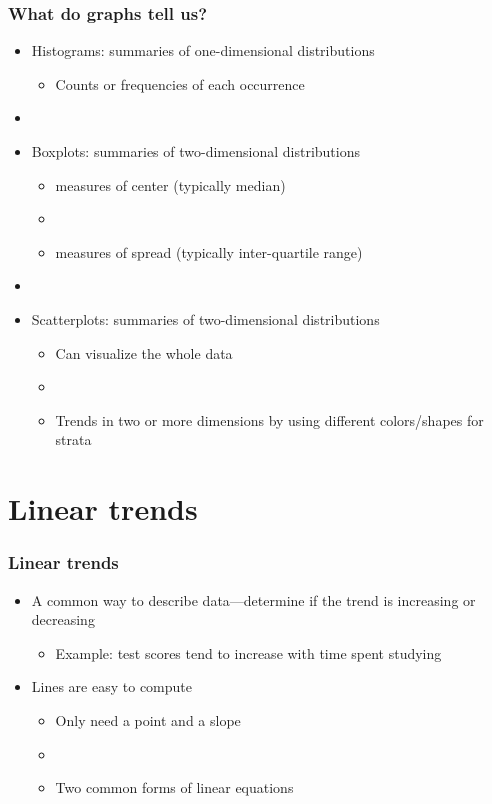 \documentclass[11pt]{beamer}
\newcommand{\myframe}[1]{\begin{frame} \frametitle{#1}}
\newenvironment{spaceitemize}
{ \begin{itemize}
    \setlength{\itemsep}{10pt}
    \setlength{\parskip}{0pt}
    \setlength{\parsep}{0pt}     }
{ \end{itemize}                  }
\begin{document}
\myframe{What do graphs tell us?}
\begin{itemize}
\item Histograms: summaries of one-dimensional distributions
\begin{itemize}
\item Counts or frequencies of each occurrence
\end{itemize}
\item[]
\item Boxplots: summaries of two-dimensional distributions
\begin{itemize}
\item measures of center (typically median)
\item[]
\item measures of spread (typically inter-quartile range)
\end{itemize}
\item[]
\item Scatterplots: summaries of two-dimensional distributions
\begin{itemize}
\item Can visualize the whole data
\item[]
\item Trends in two or more dimensions by using different colors/shapes for strata
\end{itemize}
\end{itemize}
\end{frame}

\section{Linear trends}
\myframe{Linear trends}
\begin{spaceitemize}
\item A common way to describe data---determine if the trend is increasing or decreasing
\begin{itemize}
\item Example: test scores tend to increase with time spent studying
\end{itemize} 
\item Lines are easy to compute
\begin{itemize}
\item Only need a point and a slope
\item[]
\item Two common forms of linear equations
\end{itemize}
\end{spaceitemize}
\end{frame}
\end{document}
